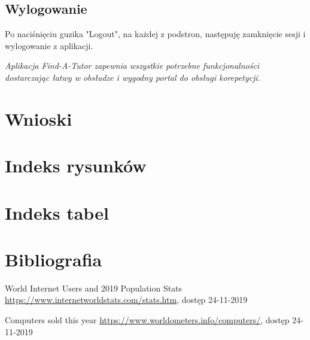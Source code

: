 \documentclass[12pt]{article}
\numberwithin{figure}{section}
\begin{document}
\begin{sloppypar}
\subsection{Wylogowanie}
Po naciśnięciu guzika "Logout", na każdej z podstron, następuję zamknięcie sesji i wylogowanie z aplikacji. \newline

\textit{Aplikacja Find-A-Tutor zapewnia wszystkie potrzebne funkcjonalności dostarczając łatwy w obsłudze i wygodny portal do obsługi korepetycji.}

\section{Wnioski}

    \clearpage
    
    \section{Indeks rysunków}
        \listoffigures
    \clearpage    
    
    \section{Indeks tabel}
        \listoftables
    \clearpage
    
    \section{Bibliografia}
    \renewcommand{\section}[2]{}
    \begin{thebibliography}{99}
    
    World Internet Users and 2019 Population Stats
    \url{https://www.internetworldstats.com/stats.htm}, dostęp 24-11-2019

    Computers sold this year
    \url{https://www.worldometers.info/computers/}, dostęp 24-11-2019
     

\end{thebibliography}
\end{sloppypar}
\end{document}
